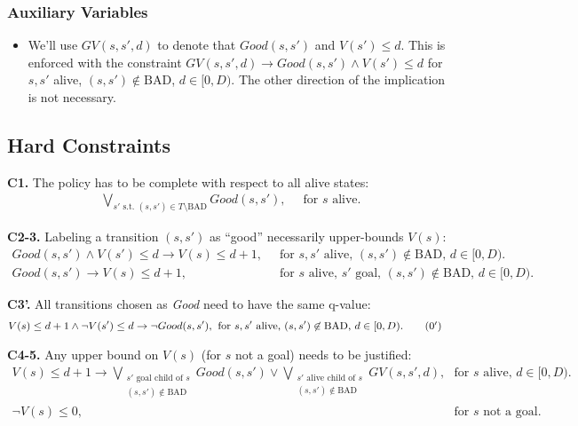 \documentclass[a4paper]{article}
\newcommand{\smallpar}[1]{{\vspace{10pt}\noindent \bf #1.}}
\newcommand{\badtx}{\ensuremath{\mathrm{BAD}}}
\begin{document}
\subsubsection{Auxiliary Variables}
\begin{itemize}
 \item We'll use $GV(s, s', d)$ to denote that $Good(s, s')$ and $V(s') \leq d$. This is enforced with the constraint
 $GV(s, s', d) \rightarrow Good(s, s') \land V(s') \leq d$ for $s, s'$ alive, $(s, s') \not\in \badtx$, $d \in [0, D)$.
 The other direction of the implication is not necessary.
\end{itemize}

\newpage

\subsection{Hard Constraints}

\smallpar{C1}
The policy has to be complete with respect to all alive states:
\begin{align}
\bigvee_{s' \text{ s.t. } (s, s') \in T \setminus \badtx} Good(s, s'),&\;\; \text{for $s$ alive.}
\end{align}


\smallpar{C2-3} Labeling a transition $(s, s')$ as ``good'' necessarily upper-bounds $V(s)$:
\begin{align}
 Good(s, s') \land V(s') \leq d \rightarrow V(s) \leq d+1,&\;\; \text{for $s, s'$ alive, $(s, s') \not\in \badtx$, $d \in [0, D)$.} \\
 Good(s, s') \rightarrow V(s) \leq d+1,&\;\; \text{for $s$ alive, $s'$ goal, $(s, s') \not\in \badtx$, $d \in [0, D)$.}
\end{align}

\smallpar{C3'} All transitions chosen as \emph{Good} need to have the same q-value:
\begin{align}
 V(s) \leq d+1 \land \neg V(s') \leq d \rightarrow \neg Good(s, s'),&\;\; \text{for $s, s'$ alive, $(s, s') \not\in \badtx$, $d \in [0, D)$.} \tag{\theequation${}^\prime$}
\end{align}


\smallpar{C4-5} Any upper bound on $V(s)$ (for $s$ not a goal) needs to be justified:
\begin{align}
 V(s) \leq d+1 \rightarrow \bigvee_{\substack{
 s' \text{ goal child of } s\\
 (s, s') \not\in \badtx}} Good(s, s') \lor
 \bigvee_{\substack{
 s' \text{ alive child of } s\\
 (s, s') \not\in \badtx}} GV(s, s', d),&
 \;\; \text{for $s$ alive, $d \in [0, D)$.} \\
 \neg V(s) \leq 0,&\;\; \text{for $s$ not a goal.}
\end{align}
\end{document}
